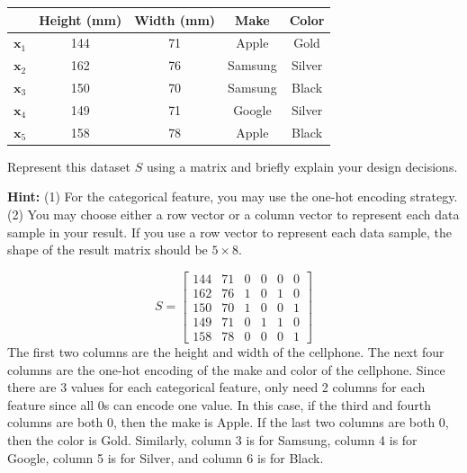\documentclass{article}
\newcommand{\x}{\mathbf{x}}
\begin{document}
\begin{probset}
\begin{prob}
    \begin{center}
        \begin{tabular}{c|||c|c|c|c}
            & Height (mm) & Width (mm) & Make & Color \\
            \hline
            $\x_1$ & 144 & 71 & Apple & Gold \\
            $\x_2$ & 162 & 76 & Samsung & Silver \\
            $\x_3$ & 150 & 70 & Samsung & Black \\
            $\x_4$ & 149 & 71 & Google & Silver \\
            $\x_5$ & 158 & 78 & Apple & Black \\
            \hline
        \end{tabular}
    \end{center}

    Represent this dataset $S$ using a matrix and briefly explain your design decisions.

    \textbf{Hint:} (1) For the categorical feature, you may use the one-hot encoding strategy. (2) You may choose either a row vector or a column vector to represent each data sample in your result. If you use a row vector to represent each data sample, the shape of the result matrix should be $5 \times 8$.

    \begin{soln}
        \[ S = \begin{bmatrix} 144 & 71 & 0 & 0 & 0 & 0 \\ 162 & 76 & 1 & 0 & 1 & 0 \\ 150 & 70 & 1 & 0 & 0 & 1 \\ 149 & 71 & 0 & 1 & 1 & 0 \\ 158 & 78 & 0 & 0 & 0 & 1 \end{bmatrix} \]
        The first two columns are the height and width of the cellphone. The next four columns are the one-hot encoding of the make and color of the cellphone. Since there are 3 values for each categorical feature, only need 2 columns for each feature since all 0s can encode one value. In this case, if the third and fourth columns are both 0, then the make is Apple. If the last two columns are both 0, then the color is Gold. Similarly, column 3 is for Samsung, column 4 is for Google, column 5 is for Silver, and column 6 is for Black.
    \end{soln}
\end{prob}


\end{probset}
\end{document}
